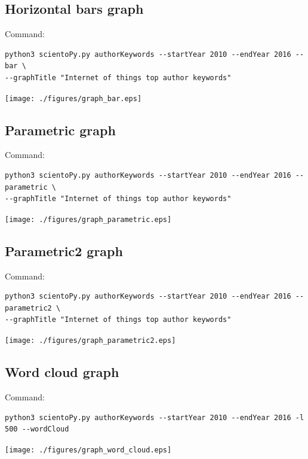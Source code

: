 \documentclass[10pt,letterpaper]{article}
\begin{document}
\subsection{Horizontal bars graph}
Command: 
\begin{verbatim}
python3 scientoPy.py authorKeywords --startYear 2010 --endYear 2016 --bar \
--graphTitle "Internet of things top author keywords"
\end{verbatim}

\begin{center}
	\texttt{[image: ./figures/graph\_bar.eps]}
\end{center}

\subsection{Parametric graph}
Command: 
\begin{verbatim}
python3 scientoPy.py authorKeywords --startYear 2010 --endYear 2016 --parametric \
--graphTitle "Internet of things top author keywords"
\end{verbatim}

\begin{center}
	\texttt{[image: ./figures/graph\_parametric.eps]}
\end{center}

\subsection{Parametric2 graph}
Command: 
\begin{verbatim}
python3 scientoPy.py authorKeywords --startYear 2010 --endYear 2016 --parametric2 \
--graphTitle "Internet of things top author keywords"
\end{verbatim}

\begin{center}
	\texttt{[image: ./figures/graph\_parametric2.eps]}
\end{center}


\subsection{Word cloud graph}
Command: 
\begin{verbatim}
python3 scientoPy.py authorKeywords --startYear 2010 --endYear 2016 -l 500 --wordCloud
\end{verbatim}

\begin{center}
	\texttt{[image: ./figures/graph\_word\_cloud.eps]}
\end{center}
\end{document}
